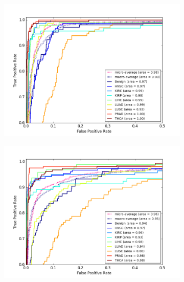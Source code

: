 \begin{figure}[H]
     \centering
     \begin{subfigure}[b]{0.49\textwidth}
         \centering
         \includegraphics[width=\textwidth]{img/m_r/m_r_sdae_dgmu_roc.png}
         \caption{}
     \end{subfigure}
     \hfill
     \begin{subfigure}[b]{0.49\textwidth}
         \centering
         \includegraphics[width=\textwidth]{img/m_r/m_r_sdae_gmu_roc.png}
         \caption{}
     \end{subfigure}
     \hfill
     \begin{subfigure}[b]{0.49\textwidth}
         \centering

\end{subfigure}
\end{figure}
